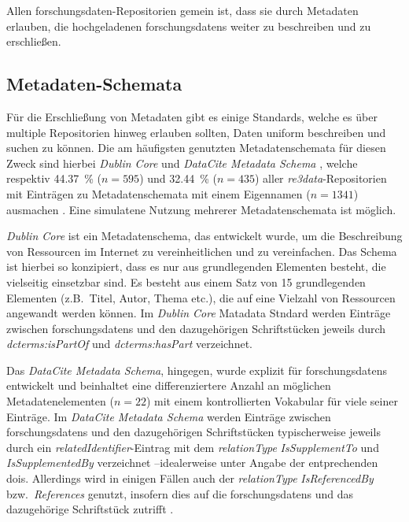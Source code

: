 Allen \gls{forschungsdaten}-Repositorien gemein ist, dass sie durch Metadaten erlauben, die hochgeladenen \glspl{forschungsdaten} weiter zu beschreiben und zu erschließen.

\subsection{Metadaten-Schemata}\label{sec:forschungsstand-basics-metadata}
Für die Erschließung von Metadaten gibt es einige Standards, welche es über multiple Repositorien hinweg erlauben sollten, Daten uniform beschreiben und suchen zu können.
Die am häufigsten genutzten Metadatenschemata für diesen Zweck sind hierbei \textit{Dublin Core} \autocite{dublincore} und \textit{DataCite Metadata Schema} \autocite{datacite}, welche respektiv \SI{44.37}{\percent} ($n=\num{595}$) und \SI{32.44}{\percent} ($n=\num{435}$) aller \textit{re3data}-Repositorien mit Einträgen zu Metadatenschemata mit einem Eigennamen ($n=\num{1341}$) ausmachen \autocite{Khan2024,re3data-metadata}.
Eine simulatene Nutzung mehrerer Metadatenschemata ist möglich.

\textit{Dublin Core} ist ein Metadatenschema, das entwickelt wurde, um die Beschreibung von Ressourcen im Internet zu vereinheitlichen und zu vereinfachen.
Das Schema ist hierbei so konzipiert, dass es nur aus grundlegenden Elementen besteht, die vielseitig einsetzbar sind.
Es besteht aus einem Satz von \num{15} grundlegenden Elementen (z.B.~Titel, Autor, Thema etc.), die auf eine Vielzahl von Ressourcen angewandt werden können.
Im \textit{Dublin Core} Matadata Stndard werden Einträge zwischen \glspl{forschungsdaten} und den dazugehörigen Schriftstücken jeweils durch \textit{dcterms:isPartOf} und \textit{dcterms:hasPart} verzeichnet.

Das \textit{DataCite Metadata Schema}, hingegen, wurde explizit für \glspl{forschungsdaten} entwickelt und beinhaltet eine differenziertere Anzahl an möglichen Metadatenelementen ($n=\num{22}$) mit einem kontrollierten Vokabular für viele seiner Einträge.
Im \textit{DataCite Metadata Schema} werden Einträge zwischen \glspl{forschungsdaten} und den dazugehörigen Schriftstücken typischerweise jeweils durch ein \textit{relatedIdentifier}-Eintrag mit dem \textit{relationType} \textit{IsSupplementTo} und \textit{IsSupplementedBy} verzeichnet \autocite{starr2011iscitedby,Cousijn2019}--idealerweise unter Angabe der entprechenden \glspl{doi}.
Allerdings wird in einigen Fällen auch der \textit{relationType} \textit{IsReferencedBy} bzw.~\textit{References} genutzt, insofern dies auf die \glspl{forschungsdaten} und das dazugehörige Schriftstück zutrifft \autocite{Cousijn2019}.

